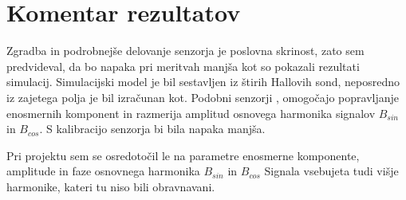 \section{Komentar rezultatov}
Zgradba in podrobnejše delovanje senzorja je poslovna skrinost, zato sem predvideval, da bo napaka pri meritvah manjša kot so pokazali rezultati simulacij. Simulacijski model je bil sestavljen iz štirih Hallovih sond, neposredno iz zajetega polja je bil izračunan kot. 
Podobni senzorji \cite{iCMHM}, omogočajo popravljanje enosmernih komponent in razmerija amplitud osnovega harmonika signalov  $B_{sin}$ in $B_{cos}$. S kalibracijo senzorja bi bila napaka manjša.

Pri projektu sem se osredotočil le na parametre enosmerne komponente, amplitude in faze osnovnega harmonika  $B_{sin}$ in $B_{cos}$ Signala vsebujeta tudi višje harmonike, kateri tu niso bili obravnavani.



